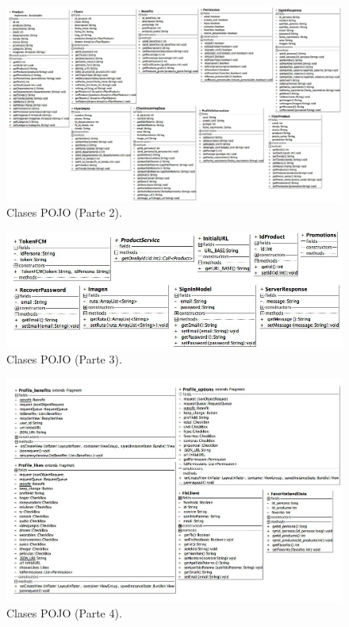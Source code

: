 \begin{figure}[htbp!]
		\centering
			\includegraphics[width=1.1 \textwidth]{imagenes/aidp_clases/pojo2}
		\caption{Clases POJO (Parte 2).}
		\label{image:pojo2}
\end{figure}
\FloatBarrier
\FloatBarrier
\begin{figure}[htbp!]
		\centering
			\includegraphics[width=1.1 \textwidth]{imagenes/aidp_clases/pojo3}
		\caption{Clases POJO (Parte 3).}
		\label{image:pojo3}
\end{figure}
\FloatBarrier
\FloatBarrier
\begin{figure}[htbp!]
		\centering
			\includegraphics[width=1.1 \textwidth]{imagenes/aidp_clases/pojo4}
		\caption{Clases POJO (Parte 4).}
		\label{image:pojo4}
\end{figure}
